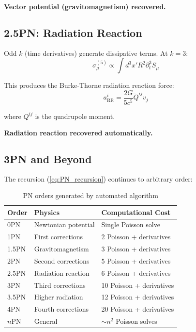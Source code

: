 \documentclass[11pt,a4paper]{article}
\theoremstyle{definition}
\theoremstyle{remark}
\begin{document}
		\textbf{Vector potential (gravitomagnetism) recovered.} \checkmark
		
		\subsection{2.5PN: Radiation Reaction}
		
		Odd $k$ (time derivatives) generate dissipative terms. At $k=3$:
		\begin{equation}
			\sigma_\mu^{(5)} \propto \int d^3x' R^2 \partial_t^3 S_\mu
		\end{equation}
		
		This produces the Burke-Thorne radiation reaction force:
		\begin{equation}
			\boxed{a_{\text{RR}}^i = \frac{2G}{5c^5}\dddot{Q}^{ij}v_j}
		\end{equation}
		
		where $Q^{ij}$ is the quadrupole moment.
		
		\textbf{Radiation reaction recovered automatically.} \checkmark
		
		\subsection{3PN and Beyond}
		
		The recursion (\ref{eq:PN_recursion}) continues to arbitrary order:
		
		\begin{table}[h]
			\centering
			\caption{PN orders generated by automated algorithm}
			\begin{tabular}{@{}lll@{}}
				\toprule
				\textbf{Order} & \textbf{Physics} & \textbf{Computational Cost} \\
				\midrule
				0PN & Newtonian potential & Single Poisson solve \\
				1PN & First corrections & 2 Poisson + derivatives \\
				1.5PN & Gravitomagnetism & 3 Poisson + derivatives \\
				2PN & Second corrections & 5 Poisson + derivatives \\
				2.5PN & Radiation reaction & 6 Poisson + derivatives \\
				3PN & Third corrections & 10 Poisson + derivatives \\
				3.5PN & Higher radiation & 12 Poisson + derivatives \\
				4PN & Fourth corrections & 20 Poisson + derivatives \\
				\midrule
				$n$PN & General & $\sim n^2$ Poisson solves \\
				\bottomrule
			\end{tabular}
		\end{table}
		
\end{document}
